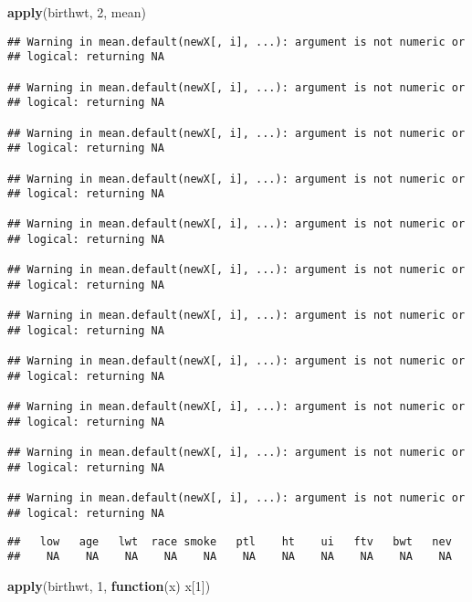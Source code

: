 \documentclass[]{book}
\newenvironment{Shaded}{\begin{snugshade}}{\end{snugshade}}
\newcommand{\ControlFlowTok}[1]{\textcolor[rgb]{0.13,0.29,0.53}{\textbf{#1}}}
\newcommand{\DecValTok}[1]{\textcolor[rgb]{0.00,0.00,0.81}{#1}}
\newcommand{\KeywordTok}[1]{\textcolor[rgb]{0.13,0.29,0.53}{\textbf{#1}}}
\newcommand{\NormalTok}[1]{#1}
\begin{document}
\begin{Shaded}
\begin{Highlighting}[]
\KeywordTok{apply}\NormalTok{(birthwt, }\DecValTok{2}\NormalTok{, mean)}
\end{Highlighting}
\end{Shaded}

\begin{verbatim}
## Warning in mean.default(newX[, i], ...): argument is not numeric or
## logical: returning NA

## Warning in mean.default(newX[, i], ...): argument is not numeric or
## logical: returning NA

## Warning in mean.default(newX[, i], ...): argument is not numeric or
## logical: returning NA

## Warning in mean.default(newX[, i], ...): argument is not numeric or
## logical: returning NA

## Warning in mean.default(newX[, i], ...): argument is not numeric or
## logical: returning NA

## Warning in mean.default(newX[, i], ...): argument is not numeric or
## logical: returning NA

## Warning in mean.default(newX[, i], ...): argument is not numeric or
## logical: returning NA

## Warning in mean.default(newX[, i], ...): argument is not numeric or
## logical: returning NA

## Warning in mean.default(newX[, i], ...): argument is not numeric or
## logical: returning NA

## Warning in mean.default(newX[, i], ...): argument is not numeric or
## logical: returning NA

## Warning in mean.default(newX[, i], ...): argument is not numeric or
## logical: returning NA
\end{verbatim}

\begin{verbatim}
##   low   age   lwt  race smoke   ptl    ht    ui   ftv   bwt   nev 
##    NA    NA    NA    NA    NA    NA    NA    NA    NA    NA    NA
\end{verbatim}

\begin{Shaded}
\begin{Highlighting}[]
\KeywordTok{apply}\NormalTok{(birthwt, }\DecValTok{1}\NormalTok{, }\ControlFlowTok{function}\NormalTok{(x) x[}\DecValTok{1}\NormalTok{])}
\end{Highlighting}
\end{Shaded}
\end{document}
